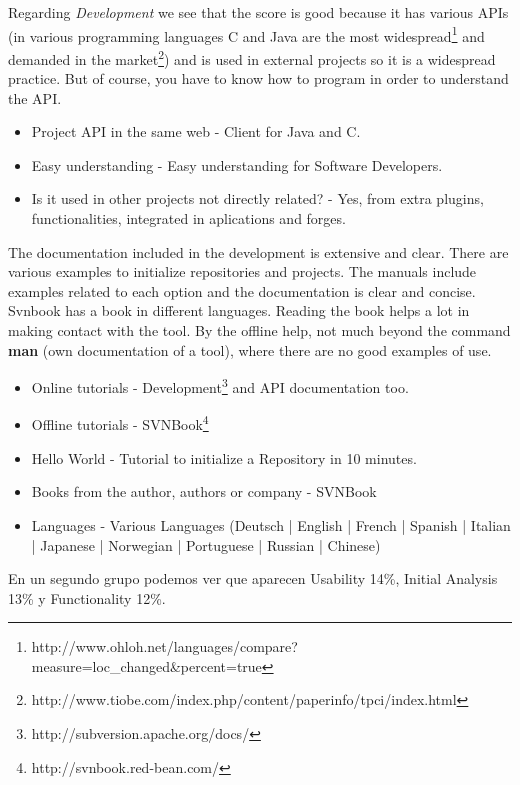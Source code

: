 \documentclass[11pt]{scrartcl}
\begin{document}
\par Regarding \emph{Development} we see that the score is good because it has various APIs (in various programming languages ​​C and Java are the most widespread\footnote{http://www.ohloh.net/languages/compare?measure=loc\_changed\&percent=true} and demanded in the market\footnote{http://www.tiobe.com/index.php/content/paperinfo/tpci/index.html}) and is used in external projects so it is a widespread practice. But of course, you have to know how to program in order to understand the API.

\begin{itemize}
    \item Project API in the same web - Client for Java and C.
    \item Easy understanding - Easy understanding for Software Developers. 
    \item Is it used in other projects not directly related? - Yes, from extra plugins, functionalities, integrated in aplications and forges.
\end{itemize}
  
\par The documentation included in the development is extensive and clear. There are various examples to initialize repositories and projects. The manuals include examples related to each option and the documentation is clear and concise. Svnbook has a book in different languages. Reading the book helps a lot in making contact with the tool. By the offline help, not much beyond the command \textbf{man} (own documentation of a tool), where there are no good examples of use.

\begin{itemize}
    \item Online tutorials - Development\footnote{http://subversion.apache.org/docs/} and API documentation too.
    \item Offline tutorials - SVNBook\footnote{http://svnbook.red-bean.com/}
    \item Hello World - Tutorial to initialize a Repository in 10 minutes.
    \item Books from the author, authors or company -  SVNBook
    \item Languages - Various Languages (Deutsch | English | French | Spanish | Italian | Japanese | Norwegian | Portuguese | Russian | Chinese)
\end{itemize}

\par En un segundo grupo podemos ver que aparecen Usability 14\%, Initial Analysis 13\% y Functionality 12\%.
\end{document}

